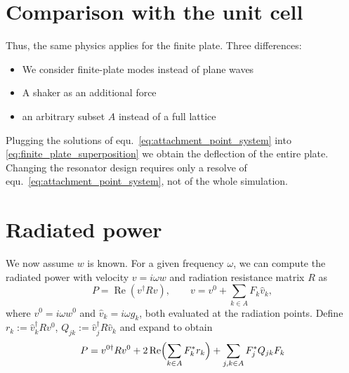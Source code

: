 \section{Comparison with the unit cell}

Thus, the same physics applies for the finite plate. Three differences:
\begin{itemize}
  \item We consider finite-plate modes instead of plane waves
  \item A shaker as an additional force
  \item an arbitrary subset $A$ instead of a full lattice
\end{itemize}
Plugging the solutions of equ.~\eqref{eq:attachment_point_system} into
\eqref{eq:finite_plate_superposition} we obtain the deflection of the entire
plate. Changing the resonator design requires only a resolve of
equ.~\eqref{eq:attachment_point_system}, not of the whole simulation.

\section{Radiated power}

We now assume $w$ is known. For a given frequency $\omega$, we can compute the
radiated power with velocity $v = i\omega w$ and radiation resistance matrix $R$
as
\begin{equation}
  P = \operatorname{Re}(v^\dagger R v) , \qquad
  v = v^0 + \sum_{k \in A} F_k \hat{v}_k ,
\end{equation}
where $v^0 = i\omega w^0$ and $\hat{v}_k = i\omega g_k$, both evaluated at the
radiation points. Define $r_k := \hat{v}_k^\dagger R v^0$,
$Q_{jk} := \hat{v}_j^\dagger R \hat{v}_k$ and expand to obtain
\begin{equation}
  P = v^{0\dagger} R v^0 + 2\operatorname{Re}\Bigl(\sum_{k \in A} F_k^* r_k\Bigr)
  + \sum_{j, k \in A} F_j^* Q_{jk} F_k
\end{equation}
